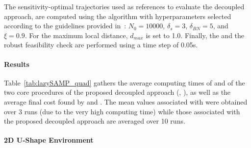 The sensitivity-optimal trajectories used as references to evaluate the decoupled approach, are computed using the  algorithm with hyperparameters selected according to the guidelines provided in~\cite{cSST}: $N_0 = 10000$, $\delta_s = 3$, $\delta_{BN} = 5$, and $\xi = 0.9$.
For the maximum local distance, $d_{max}$ is set to 1.0.
Finally, the  and the robust feasibility check are performed using a time step of 0.05s.

\paragraph{Results}



Table~\ref{tab:lazySAMP_quad} gathers the average computing times of  and of the two core procedures of the proposed decoupled approach (, ), as well as the average final cost found by  and . 
The mean values associated with  were obtained over 3 runs (due to the very high computing time) while those associated with the proposed decoupled approach are averaged over 10 runs.

\paragraph{2D U-Shape Environment} 

